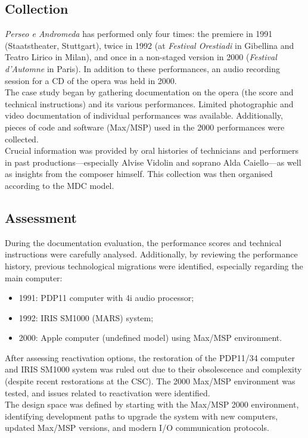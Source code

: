 \subsection*{Collection}
\textit{Perseo e Andromeda} has performed only four times: the premiere in 1991 (Staatstheater, Stuttgart), twice in 1992 (at \textit{Festival Orestiadi} in Gibellina and Teatro Lirico in Milan), and once in a non-staged version in 2000 (\textit{Festival d’Automne} in Paris). In addition to these performances, an audio recording session for a CD of the opera was held in 2000.\\
The case study began by gathering documentation on the opera (the score and technical instructions) and its various performances. Limited photographic and video documentation of individual performances was available. Additionally, pieces of code and software (Max/MSP) used in the 2000 performances were collected.\\
Crucial information was provided by oral histories of technicians and performers in past productions—especially Alvise Vidolin and soprano Alda Caiello—as well as insights from the composer himself. This collection was then organised according to the MDC model.

\subsection*{Assessment}
During the documentation evaluation, the performance scores and technical instructions were carefully analysed. Additionally, by reviewing the performance history, previous technological migrations were identified, especially regarding the main computer:
\begin{itemize}
    \item 1991: PDP11 computer with 4i audio processor;
    \item 1992: IRIS SM1000 (MARS) system;
    \item 2000: Apple computer (undefined model) using Max/MSP environment.
\end{itemize}
After assessing reactivation options, the restoration of the PDP11/34 computer and IRIS SM1000 system was ruled out due to their obsolescence and complexity (despite recent restorations at the CSC). The 2000 Max/MSP environment was tested, and issues related to reactivation were identified.\\
The design space was defined by starting with the Max/MSP 2000 environment, identifying development paths to upgrade the system with new computers, updated Max/MSP versions, and modern I/O communication protocols.

